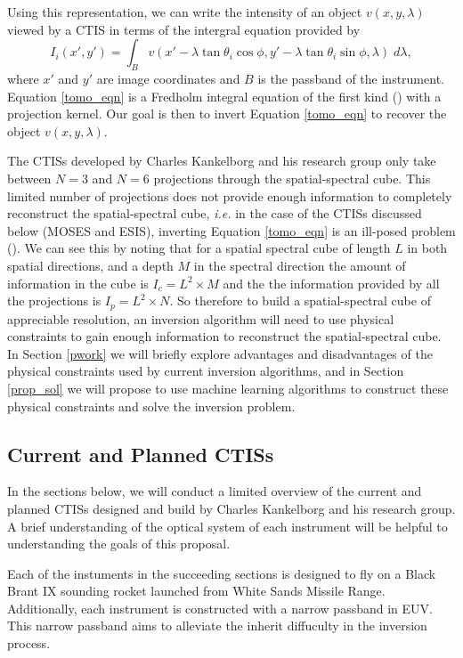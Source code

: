 \documentclass{article}
\begin{document}
			Using this representation, we can write the intensity of an object $v(x,y,\lambda)$ viewed by a CTIS in terms of the intergral equation provided by \cite{fox1}
			\begin{equation}
				I_i (x',y') = \int_B v(x' - \lambda \tan \theta_i \cos \phi, y' - \lambda \tan \theta_i \sin \phi, \lambda) \; d\lambda,
				\label{tomo_eqn}
			\end{equation}
			where $x'$ and $y'$ are image coordinates and $B$ is the passband of the instrument. Equation \ref{tomo_eqn} is a Fredholm integral equation of the first kind (\cite{RHB}) with a projection kernel. Our goal is then to invert Equation \ref{tomo_eqn} to recover the object $v(x,y,\lambda)$.
			
			The CTISs developed by Charles Kankelborg and his research group only take between $N=3$ and $N=6$ projections through the spatial-spectral cube. This limited number of projections does not provide enough information to completely reconstruct the spatial-spectral cube, \textit{i.e.} in the case of the CTISs discussed below (MOSES and ESIS), inverting Equation \ref{tomo_eqn} is an ill-posed problem (\cite{inversion}). We can see this by noting that for a spatial spectral cube of length $L$ in both spatial directions, and a depth $M$ in the spectral direction the amount of information in the cube is $I_c = L^2 \times M$ and the the information provided by all the projections is $I_p = L^2 \times N$. So therefore to build a spatial-spectral cube of appreciable resolution, an inversion algorithm will need to use physical constraints to gain enough information to reconstruct the spatial-spectral cube. In Section \ref{pwork} we will briefly explore advantages and disadvantages of the physical constraints used by current inversion algorithms, and in Section \ref{prop_sol} we will propose to use machine learning algorithms to construct these physical constraints and solve the inversion problem.
			
		\subsection{Current and Planned CTISs}

			In the sections below, we will conduct a limited overview of the current and planned CTISs designed and build by Charles Kankelborg and his research group. A brief understanding of the optical system of each instrument will be helpful to understanding the goals of this proposal. 

			Each of the instuments in the succeeding sections is designed to fly on a Black Brant IX sounding rocket launched from White Sands Missile Range. Additionally, each instrument is constructed with a narrow passband in EUV. This narrow passband aims to alleviate the inherit diffuculty in the inversion process.
\end{document}
